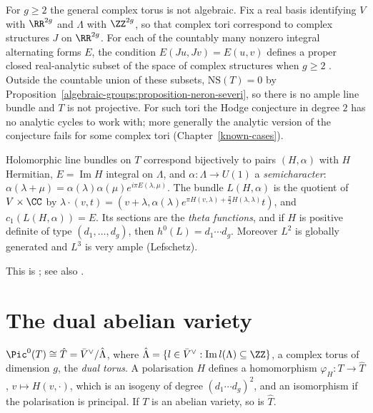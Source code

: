 \begin{counterexample}\label{algebraic-groups:counterexample-non-algebraic-torus}
For $g \geq 2$ the general complex torus is not algebraic. Fix a real basis identifying $V$ with $\RR^{2g}$ and $\Lambda$ with $\ZZ^{2g}$, so that complex tori correspond to complex
structures $J$ on $\RR^{2g}$. For each of the countably many nonzero integral alternating forms $E$, the condition $E(Ju, Jv) = E(u, v)$ defines a proper closed real-analytic subset of the
space of complex structures when $g \geq 2$ \cite{birkenhake-lange}. Outside the countable union of these subsets,
$\mathrm{NS}(T) = 0$ by Proposition~\ref{algebraic-groups:proposition-neron-severi}, so there is no ample line bundle and $T$ is not projective. For such tori the Hodge conjecture
in degree $2$ has no analytic cycles to work with; more generally the analytic version of the conjecture fails for some complex tori (Chapter~\ref{known-cases}).
\end{counterexample}

\begin{theorem}\label{algebraic-groups:theorem-appell-humbert}
Holomorphic line bundles on $T$ correspond bijectively to pairs $(H, \alpha)$ with $H$ Hermitian, $E = \operatorname{Im}H$ integral on $\Lambda$, and $\alpha \colon \Lambda \to U(1)$ a
\emph{semicharacter}: $\alpha(\lambda + \mu) = \alpha(\lambda)\alpha(\mu)e^{i\pi E(\lambda, \mu)}$. The bundle $L(H, \alpha)$ is the quotient of $V \times \CC$ by
$\lambda \cdot (v, t) = (v + \lambda, \alpha(\lambda)e^{\pi H(v, \lambda) + \frac{\pi}{2}H(\lambda, \lambda)}t)$, and $c_1(L(H, \alpha)) = E$. Its sections are the
\emph{theta functions}, and if $H$ is positive definite of type $(d_1, \ldots, d_g)$, then $h^0(L) = d_1 \cdots d_g$. Moreover $L^2$ is globally generated and $L^3$ is very ample
(Lefschetz).
\end{theorem}

This is \cite{birkenhake-lange}; see also \cite{mumford-abelian}.

\section{The dual abelian variety}\label{algebraic-groups:section-dual}

\begin{proposition}\label{algebraic-groups:proposition-dual}
$\Pic^0(T) \cong \hat T = \bar V^\vee/\hat\Lambda$, where $\hat\Lambda = \{l \in \bar V^\vee : \operatorname{Im}l(\Lambda) \subseteq \ZZ\}$, a complex torus of dimension $g$, the
\emph{dual torus}. A polarisation $H$ defines a homomorphism $\varphi_H \colon T \to \hat T$, $v \mapsto H(v, \cdot)$, which is an isogeny of degree $(d_1 \cdots d_g)^2$, and an
isomorphism if the polarisation is principal. If $T$ is an abelian variety, so is $\hat T$.
\end{proposition}

